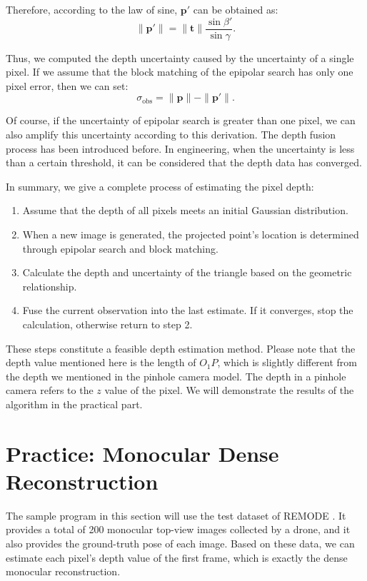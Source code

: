 Therefore, according to the law of sine, $\mathbf{p}'$ can be obtained as:
\begin{equation}
	\| \mathbf{p}' \| = \| \mathbf{t} \| \frac{{\sin \beta '}}{{\sin \gamma }}.
\end{equation}

Thus, we computed the depth uncertainty caused by the uncertainty of a single pixel. If we assume that the block matching of the epipolar search has only one pixel error, then we can set:
\begin{equation}
	\sigma_{\mathrm{obs}} = \| \mathbf{p} \|-\| \mathbf{p}' \|.
\end{equation}

Of course, if the uncertainty of epipolar search is greater than one pixel, we can also amplify this uncertainty according to this derivation. The depth fusion process has been introduced before. In engineering, when the uncertainty is less than a certain threshold, it can be considered that the depth data has converged.

In summary, we give a complete process of estimating the pixel depth:
\begin{mdframed}
\begin{enumerate}
	\item Assume that the depth of all pixels meets an initial Gaussian distribution.
	\item When a new image is generated, the projected point's location is determined through epipolar search and block matching.
	\item Calculate the depth and uncertainty of the triangle based on the geometric relationship.
	\item Fuse the current observation into the last estimate. If it converges, stop the calculation, otherwise return to step 2.
\end{enumerate}
\end{mdframed}

These steps constitute a feasible depth estimation method. Please note that the depth value mentioned here is the length of $O_1 P$, which is slightly different from the depth we mentioned in the pinhole camera model. The depth in a pinhole camera refers to the $z$ value of the pixel. We will demonstrate the results of the algorithm in the practical part.

\section{Practice: Monocular Dense Reconstruction}
The sample program in this section will use the test dataset of REMODE {\cite{Handa2012, Pizzoli2014}}. It provides a total of 200 monocular top-view images collected by a drone, and it also provides the ground-truth pose of each image. Based on these data, we can estimate each pixel's depth value of the first frame, which is exactly the dense monocular reconstruction.

